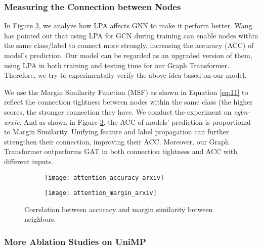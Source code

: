 \subsubsection{Measuring the Connection between Nodes}


In Figure \ref{fig:attenion_image}, we analyze how LPA affects GNN to make it perform better. Wang~ has pointed out that using LPA for GCN during training can enable nodes within the same class/label to connect more strongly, increasing the accuracy (ACC) of model's prediction. Our model can be regarded as an upgraded version of them, using LPA in both training and testing time for our Graph Transformer. Therefore, we try to experimentally verify the above idea based on our model.



We use the Margin Similarity Function (MSF) as shown in Equation \ref{eq:11} to reflect the connection tightness between nodes within the same class (the higher scores, the stronger connection they have. We conduct the experiment on \emph{ogbn-arxiv}. And as shown in Figure \ref{fig:attenion_image}, the ACC of models' prediction is proportional to Margin Similarity. Unifying feature and label propagation can further strengthen their connection, improving their ACC. Moreover, our Graph Transformer outperforms GAT in both connection tightness and ACC with different inputs.

\begin{figure}[htpb]
\centering
	\begin{subfigure}[b]{.48\columnwidth}
		\texttt{[image: attention\_accuracy\_arxiv]}
		\label{figure:attention_accuracy}
	\end{subfigure}
	\begin{subfigure}[b]{.48\columnwidth}
		\texttt{[image: attention\_margin\_arxiv]}
		\label{figure:attention_margin}
	\end{subfigure}
\setlength{\belowcaptionskip}{-.4cm}
	\caption{Correlation between accuracy and margin similarity between neighbors.}
	\label{fig:attenion_image}
\end{figure}



\subsubsection{More Ablation Studies on UniMP}

